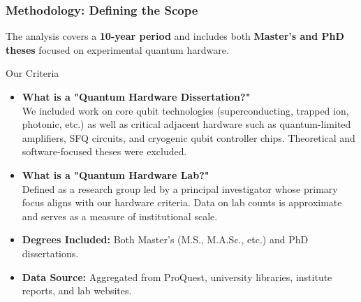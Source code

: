 \documentclass[aspectratio=169]{beamer}
\begin{document}
\begin{frame}
    \frametitle{Methodology: Defining the Scope}
    
    The analysis covers a \textbf{10-year period} and includes both \textbf{Master's and PhD theses} focused on experimental quantum hardware.

    \begin{block}{Our Criteria}
        \begin{itemize}
            \item \textbf{What is a "Quantum Hardware Dissertation?"} \\
            We included work on core qubit technologies (superconducting, trapped ion, photonic, etc.) as well as critical adjacent hardware such as quantum-limited amplifiers, SFQ circuits, and cryogenic qubit controller chips. Theoretical and software-focused theses were excluded.
            \vspace{1em}
            \item \textbf{What is a "Quantum Hardware Lab?"} \\
            Defined as a research group led by a principal investigator whose primary focus aligns with our hardware criteria. Data on lab counts is approximate and serves as a measure of institutional scale.
            \item \textbf{Degrees Included:} Both Master's (M.S., M.A.Sc., etc.) and PhD dissertations.
            \vspace{1em}
            \item \textbf{Data Source:} Aggregated from ProQuest, university libraries, institute reports, and lab websites. 
        \end{itemize}
    \end{block}
\end{frame}
\end{document}

